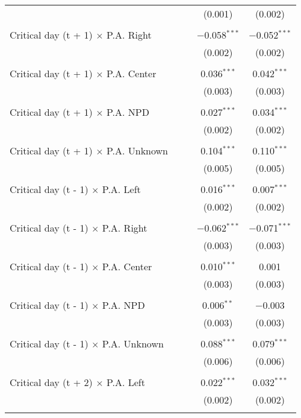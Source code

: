 \documentclass[
]{article}
\begin{document}
\begin{table}[!htbp]
{\begin{tabular}{@{\extracolsep{5pt}}lcccc}
  &  &  & (0.001) & (0.002) \\ 
  & & & & \\ 
 Critical day (t + 1) $\times$ P.A. Right &  &  & $-$0.058$^{***}$ & $-$0.052$^{***}$ \\ 
  &  &  & (0.002) & (0.002) \\ 
  & & & & \\ 
 Critical day (t + 1) $\times$ P.A. Center &  &  & 0.036$^{***}$ & 0.042$^{***}$ \\ 
  &  &  & (0.003) & (0.003) \\ 
  & & & & \\ 
 Critical day (t + 1) $\times$ P.A. NPD &  &  & 0.027$^{***}$ & 0.034$^{***}$ \\ 
  &  &  & (0.002) & (0.002) \\ 
  & & & & \\ 
 Critical day (t + 1) $\times$ P.A. Unknown &  &  & 0.104$^{***}$ & 0.110$^{***}$ \\ 
  &  &  & (0.005) & (0.005) \\ 
  & & & & \\ 
 Critical day (t - 1) $\times$ P.A. Left &  &  & 0.016$^{***}$ & 0.007$^{***}$ \\ 
  &  &  & (0.002) & (0.002) \\ 
  & & & & \\ 
 Critical day (t - 1) $\times$ P.A. Right &  &  & $-$0.062$^{***}$ & $-$0.071$^{***}$ \\ 
  &  &  & (0.003) & (0.003) \\ 
  & & & & \\ 
 Critical day (t - 1) $\times$ P.A. Center &  &  & 0.010$^{***}$ & 0.001 \\ 
  &  &  & (0.003) & (0.003) \\ 
  & & & & \\ 
 Critical day (t - 1) $\times$ P.A. NPD &  &  & 0.006$^{**}$ & $-$0.003 \\ 
  &  &  & (0.003) & (0.003) \\ 
  & & & & \\ 
 Critical day (t - 1) $\times$ P.A. Unknown &  &  & 0.088$^{***}$ & 0.079$^{***}$ \\ 
  &  &  & (0.006) & (0.006) \\ 
  & & & & \\ 
 Critical day (t + 2) $\times$ P.A. Left &  &  & 0.022$^{***}$ & 0.032$^{***}$ \\ 
  &  &  & (0.002) & (0.002) \\ 
  & & & & \\ 

\end{tabular}}
\end{table}
\end{document}
